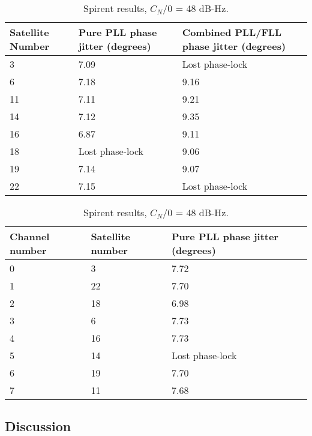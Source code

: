\begin{table}[!htb]
\centering
\begin{tabular}{|l|l|l|}
\hline
\rowcolor[HTML]{C0C0C0} 
Satellite Number & Pure PLL phase jitter (degrees) & Combined PLL/FLL phase jitter (degrees) \\ \hline
3                & 7.09                            & Lost phase-lock                               \\ \hline
\rowcolor[HTML]{EFEFEF} 
6                & 7.18                            & 9.16                                    \\ \hline
11               & 7.11                            & 9.21                                    \\ \hline
\rowcolor[HTML]{EFEFEF} 
14               & 7.12                            & 9.35                                    \\ \hline
16               & 6.87                            & 9.11                                    \\ \hline
\rowcolor[HTML]{EFEFEF} 
18               & Lost phase-lock                          & 9.06                                    \\ \hline
19               & 7.14                            & 9.07                                    \\ \hline
\rowcolor[HTML]{EFEFEF} 
22               & 7.15                            & Lost phase-lock                               \\ \hline
\end{tabular}
\caption{Spirent results, $C_N/0$ = 48 dB-Hz.}
\label{tab:SpirentCNO48}
\end{table}


\begin{table}[!htb]
\centering
\begin{tabular}{|l|l|l|}
\hline
\rowcolor[HTML]{C0C0C0} 
Channel number & Satellite number & Pure PLL phase jitter (degrees)      \\ \hline
0              & 3                & 7.72 \\ \hline
\rowcolor[HTML]{EFEFEF} 
1              & 22               & 7.70 \\ \hline
2              & 18               & 6.98\\ \hline
\rowcolor[HTML]{EFEFEF} 
3              & 6                & 7.73 \\ \hline
4              & 16               & 7.73 \\ \hline
\rowcolor[HTML]{EFEFEF} 
5              & 14               & Lost phase-lock \\ \hline
6              & 19               & 7.70 \\ \hline
\rowcolor[HTML]{EFEFEF} 
7              & 11               & 7.68 \\ \hline
\end{tabular}
\label{tab:SpirentCNO42}
\caption{Spirent results, $C_N/0$ = 48 dB-Hz.}
\end{table}




\clearpage
\subsection{Discussion}




